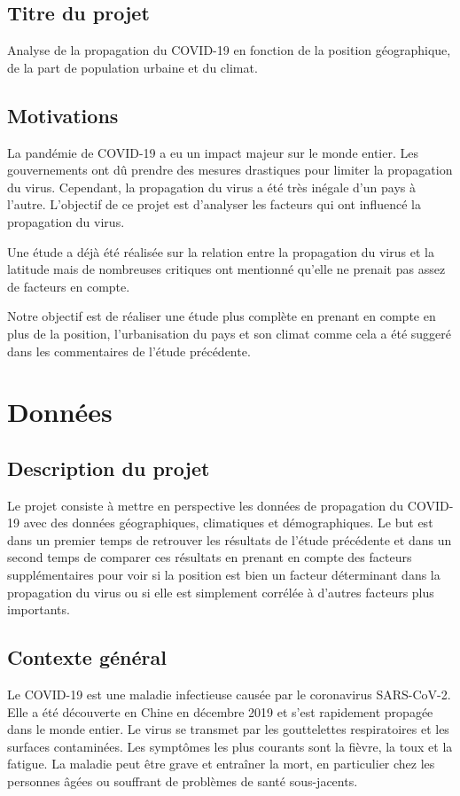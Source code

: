 \documentclass[12pt]{iEEEtran}
\begin{document}
\subsection{Titre du projet}
Analyse de la propagation du COVID-19 en fonction de la position géographique, de la part de
population urbaine et du climat. 

\subsection{Motivations}
La pandémie de COVID-19 a eu un impact majeur sur le monde entier. Les gouvernements ont dû
prendre des mesures drastiques pour limiter la propagation du virus. Cependant, la 
propagation du virus a été très inégale d'un pays à l'autre. L'objectif de ce projet 
est d'analyser les facteurs qui ont influencé la propagation du virus.

Une étude \cite{kaggle} a déjà été réalisée sur la relation entre la propagation du virus et la latitude
mais de nombreuses critiques ont mentionné qu'elle ne prenait pas assez de facteurs en compte.

Notre objectif est de réaliser une étude plus complète en prenant en compte en plus de la
position, l'urbanisation du pays et son climat comme cela a été suggeré dans les commentaires
de l'étude précédente.

\section{Données}
\subsection{Description du projet}
Le projet consiste à mettre en perspective les données de propagation du COVID-19 avec des
données géographiques, climatiques et démographiques. Le but est dans un premier temps de
retrouver les résultats de l'étude précédente \cite{kaggle} et dans un second temps de 
comparer ces résultats en prenant en compte des facteurs supplémentaires pour voir si
la position est bien un facteur déterminant dans la propagation du virus ou si elle est
simplement corrélée à d'autres facteurs plus importants.

\subsection{Contexte général}
Le COVID-19 est une maladie infectieuse causée par le coronavirus SARS-CoV-2. Elle a été
découverte en Chine en décembre 2019 et s'est rapidement propagée dans le monde entier.
Le virus se transmet par les gouttelettes respiratoires et les surfaces contaminées. Les
symptômes les plus courants sont la fièvre, la toux et la fatigue. La maladie peut être
grave et entraîner la mort, en particulier chez les personnes âgées ou souffrant de
problèmes de santé sous-jacents.
\end{document}
